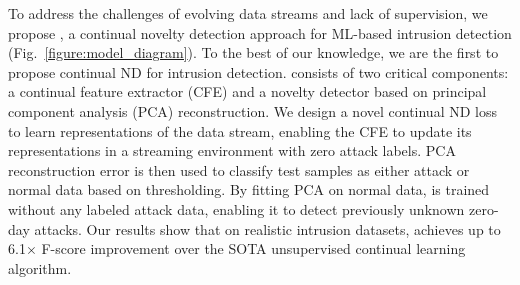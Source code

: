 To address the challenges of evolving data streams and lack of supervision, we propose \textit{\Design{}}, a continual novelty detection approach for ML-based intrusion detection (Fig.~\ref{figure:model_diagram}). To the best of our knowledge, we are the first to propose continual ND for intrusion detection. %
\Design{} consists of two critical components: a continual feature extractor (CFE) and a novelty detector based on principal component analysis (PCA) reconstruction. We design a novel continual ND loss to learn representations of the data stream, enabling the CFE to update its representations in a streaming environment with zero attack labels. %
PCA reconstruction error is then used to classify test samples as either attack or normal data based on thresholding. By fitting PCA on normal data, \Design{} is trained without any labeled attack data, enabling it to detect previously unknown zero-day attacks. Our results show that on realistic intrusion datasets, \Design{} achieves up to 6.1$\times$ F-score improvement over the SOTA unsupervised continual learning algorithm.



